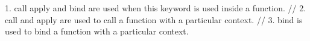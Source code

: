 1. call apply and bind are used when this keyword is used inside a function. 
// 2. call and apply are used to call a function with a particular context.
// 3. bind is used to bind a function with a particular context.
